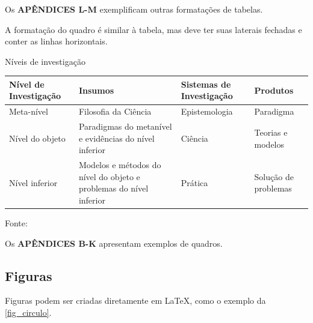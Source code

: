 \begin{table}[H]
\end{table} 

Os \textbf{APÊNDICES L-M} exemplificam outras formatações de tabelas.

A formatação do quadro é similar à tabela, mas deve ter suas laterais fechadas e conter as linhas horizontais.


\begin{quadro}[htb]
	\caption{\label{quadro_modelo}Níveis de investigação}
	\begin{tabular}{|p{2.6cm}|p{6.0cm}|p{2.25cm}|p{3.40cm}|}
		\hline
		\textbf{Nível de Investigação} & \textbf{Insumos}  & \textbf{Sistemas de Investigação}  & \textbf{Produtos}  \\
		\hline
		Meta-nível & Filosofia\index{filosofia} da Ciência  & Epistemologia &
		Paradigma  \\
		\hline
		Nível do objeto & Paradigmas do metanível e evidências do nível inferior &
		Ciência  & Teorias e modelos \\
		\hline
		Nível inferior & Modelos e métodos do nível do objeto e problemas do nível inferior & Prática & Solução de problemas  \\
		\hline
	\end{tabular}
	\begin{flushleft}
		Fonte: \citeonline{van1986}
	\end{flushleft}
\end{quadro} 


Os \textbf{APÊNDICES B-K} apresentam exemplos de quadros.

\subsection{Figuras}\label{sec_figuras}
Figuras podem ser criadas diretamente em \LaTeX,
como o exemplo da \autoref{fig_circulo}. \\ 

